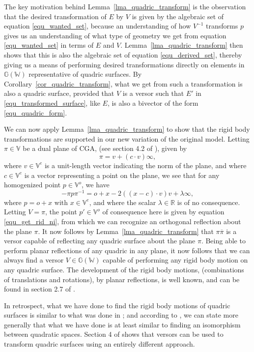 \documentclass{birkjour}
\theoremstyle{definition}
\theoremstyle{remark}
\numberwithin{equation}{section}
\newcommand{\G}{\mathbb{G}}
\newcommand{\V}{\mathbb{V}}
\newcommand{\W}{\mathbb{W}}
\newcommand{\R}{\mathbb{R}}
\newcommand{\nvao}{o}
\newcommand{\nvai}{\infty}
\begin{document}
The key motivation behind Lemma~\ref{lma_quadric_transform} is
the observation that the desired transformation of $E$ by $V$ is
given by the algebraic set of equation \eqref{equ_wanted_set}, because
an understanding of how $V^{-1}$ transforms $p$ gives us an understanding
of what type of geometry we get from equation \eqref{equ_wanted_set} in terms of
$E$ and $V$.  Lemma~\ref{lma_quadric_transform} then
shows that this is also the algebraic set of equation \eqref{equ_derived_set}, thereby
giving us a means of performing desired transformations directly on elements in $\G(\W)$ representative
of quadric surfaces.
By Corollary~\ref{cor_quadric_transform}, what we get
from such a transformation is also a quadric surface, provided that $V$ is a
versor such that $E'$
in \eqref{equ_transformed_surface}, like $E$, is also a bivector of the form \eqref{equ_quadric_form}.

We can now apply Lemma~\ref{lma_quadric_transform} to show
that the rigid body transformations are supported in our new variation
of the original model.
Letting $\pi\in\V$ be a dual plane of CGA, (see section 4.2 of \cite{Morales07}), given by
\begin{equation}
\pi = v+(c\cdot v)\nvai,
\end{equation}
where $v\in\V^e$ is a unit-length vector indicating the norm of the plane,
and where $c\in\V^e$ is a vector representing a point on the plane,
we see that for any homogenized point $p\in\V^o$, we have
\begin{equation}
-\pi p\pi^{-1} = \nvao+x-2((x-c)\cdot v)v + \lambda\nvai,
\end{equation}
where $p=\nvao+x$ with $x\in\V^e$, and
where the scalar $\lambda\in\R$ is of no consequence.  Letting $V=\pi$,
the point $p'\in\V^o$ of consequence here is given by equation \eqref{equ_get_rid_ni},
from which we can recognize an orthogonal reflection about the plane $\pi$.
It now follows by Lemma~\ref{lma_quadric_transform} that $\pi\overline{\pi}$ is a versor
capable of reflecting any quadric surface about the plane $\pi$.
Being able to perform planar reflections of any quadric in any plane, it
now follows that we can always find a versor $V\in\G(\W)$ capable of performing
any rigid body motion on any quadric surface.  The development
of the rigid body motions, (combinations of translations and rotations), by planar reflections,
is well known, and can be found in section 2.7 of \cite{LiRockwood}.

In retrospect, what we have done to find the rigid body motions
of quadric surfaces is similar to what was done in \cite{Langer08}; and
according to \cite{Pfister95}, we can state more generally that what we
have done is at least similar to finding an isomorphism between quadratic spaces.
Section 4 of \cite{Lasenby05} shows that versors can be used to transform quadric
surfaces using an entirely different approach.
\end{document}
